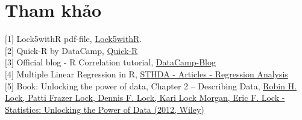 \documentclass[a4paper,12pt]{article}
\begin{document}
	\section{Tham khảo}
		\label{Tham khao}
		$\lbrack$1$\rbrack$ Lock5withR pdf-file, \href{https://drive.google.com/open?id=1YQN6KA6lvsPVCqWU-4CQJkcxd7248TqD}{Lock5withR}.\\	
		$\lbrack$2$\rbrack$ Quick-R by DataCamp, \href{https://www.statmethods.net/stats/descriptives.html}{Quick-R}\\	
		$\lbrack$3$\rbrack$ Official blog - R Correlation tutorial, \href{https://www.datacamp.com/community/blog/r-correlation-tutorial}{DataCamp-Blog}\\
		$\lbrack$4$\rbrack$ Multiple Linear Regression in R, \href{http://www.sthda.com/english/articles/40-regression-analysis/168-multiple-linear-regression-in-r/}{STHDA - Articles - Regression Analysis}\\
		$\lbrack$5$\rbrack$ Book: Unlocking the power of data, Chapter 2 – Describing Data, \href{https://drive.google.com/open?id=1ilCQevunVvqr4X8OeWca2aswWOwm-YBg}{Robin H. Lock, Patti Frazer Lock, Dennis F. Lock, Kari Lock Morgan, Eric F. Lock - Statistics: Unlocking the Power of Data (2012, Wiley)}
	
\end{document}
